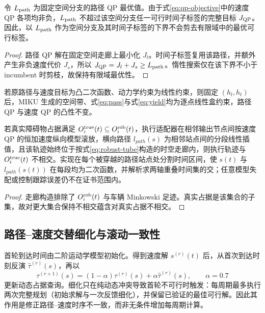 \begin{proposition}[空间分支下界的可采纳性]
令 $L_{\rm path}$ 为固定空间分支的路径 QP 最优值。由于式\eqref{eq:qp-objective}中的速度 QP 各项均非负，$L_{\rm path}$ 不超过该空间分支任一可行时间子标签的完整目标 $J_{\rm QP}$。因此，以 $L_{\rm path}$ 作为空间分支及其时间子标签的下界不会剪去有限域中的最优可行标签。
\end{proposition}
\begin{proof}
路径 QP 解在固定空间走廊上最小化 $J_l$。时间子标签复用该路径，并额外产生非负速度代价 $J_s$，所以 $J_{\rm QP}=J_l+J_s\geq L_{\rm path}$。惰性搜索仅在该下界不小于 incumbent 时剪枝，故保持有限域最优性。
\end{proof}

\begin{proposition}[固定同伦下的凸性保持]
若原路径与速度目标为凸二次函数、动力学约束为线性约束，则固定 $(h_l,h_t)$ 后，MIKU 生成的空间带、式\eqref{eq:pass}与式\eqref{eq:yield}均为逐点线性盒约束，路径 QP 与速度 QP 的凸性不变。
\end{proposition}

\begin{proposition}[占据包含下的鲁棒安全性]
若真实障碍物占据满足 $O_i^{\rm true}(t)\subseteq O_i^{\rm rob}(t)$，执行适配器在相邻输出节点间按速度 QP 的恒加速度纵向模型滚放，横向路径 $l_{path}(s)$ 为相邻站点间的分段线性插值，且该轨迹始终位于按式\eqref{eq:robust-tube}构造的时空走廊内，则执行轨迹与 $O_i^{\rm true}(t)$ 不相交。实现在每个被穿越的路径站点处分割时间区间，使 $s(t)$ 与 $l_{path}(s(t))$ 在每段均为二次函数，并解析求两轴重叠时间集的交；任意模型失配或控制跟踪误差仍不在证书范围内。
\end{proposition}
\begin{proof}
走廊构造排除了 $O_i^{\rm rob}(t)$ 与车辆 Minkowski 足迹。真实占据是该集合的子集，故对更大集合保持不相交蕴含对真实占据不相交。
\end{proof}

\subsection{路径--速度交替细化与滚动一致性}

首轮到达时间由二阶运动学模型初始化。得到速度解 $s^{(r)}(t)$ 后，从首次到达时刻反演 $\hat\tau^{(r)}(s)$，再以
\begin{equation}
 \tau^{(r+1)}(s)=(1-\alpha)\tau^{(r)}(s)+\alpha\hat\tau^{(r)}(s),
 \qquad \alpha=0.7
 \label{eq:refine}
\end{equation}
更新动态占据查询。细化只在纯动态冲突导致首轮不可行时触发：每周期最多执行两次完整规划（初始求解与一次反馈细化），并保留已验证的最佳可行解。因此其作用是修正路径--速度时序不一致，而非无条件增加每周期计算。


